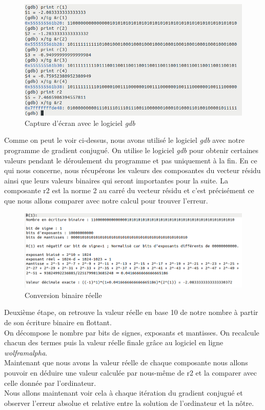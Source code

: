 \documentclass[12,french]{report}
\begin{document}
\begin{figure}[H]
	\center
	\includegraphics[width=1\textwidth]{./Images/Exemple_gdb}
	\caption{Capture d'écran avec le logiciel \textit{gdb}}
\end{figure}

Comme on peut le voir ci-dessus, nous avons utilisé le logiciel \textit{gdb} avec notre programme de gradient conjugué. On utilise le logiciel \textit{gdb} pour obtenir certaines valeurs pendant le déroulement du programme et pas uniquement à la fin. En ce qui nous concerne, nous récupérons les valeurs des composantes du vecteur résidu ainsi que leurs valeurs binaires qui seront importantes pour la suite. La composante r2 est la norme 2 au carré du vecteur résidu et c'est précisément ce que nous allons comparer avec notre calcul pour trouver l'erreur.\\

\begin{figure}[H]
	\center
	\includegraphics[width=1\textwidth]{./Images/r_0_dec}
	\caption{Conversion binaire réelle}
\end{figure}

Deuxième étape, on retrouve la valeur réelle en base 10 de notre nombre à partir de son écriture binaire en flottant.\\
On décompose le nombre par bits de signes, exposants et mantisses. On recalcule chacun des termes puis la valeur réelle finale grâce au logiciel en ligne \textit{wolframalpha}. \\
Maintenant que nous avons la valeur réelle de chaque composante nous allons pouvoir en déduire une valeur calculée par nous-même de r2 et la comparer avec celle donnée par l'ordinateur.\\
Nous allons maintenant voir cela à chaque itération du gradient conjugué et observer l'erreur absolue et relative entre la solution de l'ordinateur et la nôtre.
\end{document}
